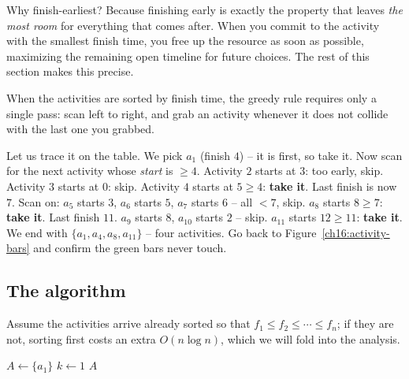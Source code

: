 Why finish-earliest? Because finishing early is exactly the property that leaves
\emph{the most room} for everything that comes after. When you commit to the
activity with the smallest finish time, you free up the resource as soon as
possible, maximizing the remaining open timeline for future choices. The rest of
this section makes this precise.

When the activities are sorted by finish time, the greedy rule requires only a single pass: scan left to right, and grab an activity whenever it does not collide with the last one you grabbed.

\begin{labbox}
Let us trace it on the table. We pick $a_1$ (finish $4$) -- it is first, so take
it. Now scan for the next activity whose \emph{start} is $\ge 4$. Activity $2$
starts at $3$: too early, skip. Activity $3$ starts at $0$: skip. Activity $4$
starts at $5 \ge 4$: \textbf{take it}. Last finish is now $7$. Scan on: $a_5$
starts $3$, $a_6$ starts $5$, $a_7$ starts $6$ -- all $< 7$, skip. $a_8$ starts
$8 \ge 7$: \textbf{take it}. Last finish $11$. $a_9$ starts $8$, $a_{10}$ starts
$2$ -- skip. $a_{11}$ starts $12 \ge 11$: \textbf{take it}. We end with
$\{a_1, a_4, a_8, a_{11}\}$ -- four activities. Go back to
Figure~\ref{ch16:activity-bars} and confirm the green bars never touch.
\end{labbox}

\subsection{The algorithm}

Assume the activities arrive already sorted so that $f_1 \le f_2 \le \cdots \le f_n$; if they are not, sorting first costs an extra $O(n \log n)$, which we will fold into the analysis.

\begin{algorithm}[H]
\caption{\textsc{Greedy-Activity-Selector}($s, f, n$)}
$A \leftarrow \{a_1\}$ 
$k \leftarrow 1$ 
\Return $A$
\end{algorithm}

